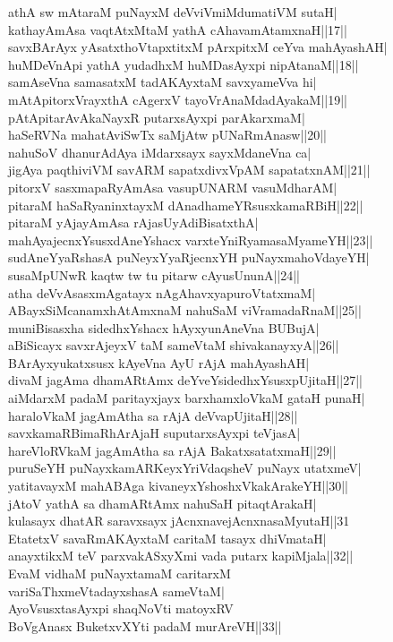 \documentclass{article}
\begin{document}
athA sw mAtaraM puNayxM deVviVmiMdumatiVM sutaH|\\
kathayAmAsa vaqtAtxMtaM yathA cAhavamAtamxnaH||17||\\
savxBArAyx yAsatxthoVtapxtitxM pArxpitxM ceYva mahAyashAH|\\
huMDeVnApi yathA yudadhxM huMDasAyxpi nipAtanaM||18||\\
samAseVna samasatxM tadAKAyxtaM savxyameVva hi|\\
mAtApitorxVrayxthA cAgerxV tayoVrAnaMdadAyakaM||19||\\
pAtApitarAvAkaNayxR putarxsAyxpi parAkarxmaM|\\
haSeRVNa mahatAviSwTx saMjAtw pUNaRmAnasw||20||\\
nahuSoV dhanurAdAya iMdarxsayx sayxMdaneVna ca|\\
jigAya paqthiviVM savARM sapatxdivxVpAM sapatatxnAM||21||\\
pitorxV sasxmapaRyAmAsa vasupUNARM vasuMdharAM|\\
pitaraM haSaRyaninxtayxM dAnadhameYRsusxkamaRBiH||22||\\
pitaraM yAjayAmAsa rAjasUyAdiBisatxthA|\\
mahAyajecnxYsusxdAneYshacx varxteYniRyamasaMyameYH||23||\\
sudAneYyaRshasA puNeyxYyaRjecnxYH puNayxmahoVdayeYH|\\
susaMpUNwR kaqtw tw tu pitarw cAyusUnunA||24||\\
atha deVvAsasxmAgatayx nAgAhavxyapuroVtatxmaM|\\
ABayxSiMcanamxhAtAmxnaM nahuSaM viVramadaRnaM||25||\\
muniBisasxha sidedhxYshacx hAyxyunAneVna BUBujA|\\
aBiSicayx savxrAjeyxV taM sameVtaM shivakanayxyA||26||\\
BArAyxyukatxsusx kAyeVna AyU rAjA mahAyashAH|\\
divaM jagAma dhamARtAmx deYveYsidedhxYsusxpUjitaH||27||\\
aiMdarxM padaM paritayxjayx barxhamxloVkaM gataH punaH|\\
haraloVkaM jagAmAtha sa rAjA deVvapUjitaH||28||\\
savxkamaRBimaRhArAjaH suputarxsAyxpi teVjasA|\\
hareVloRVkaM jagAmAtha sa rAjA BakatxsatatxmaH||29||\\
puruSeYH puNayxkamARKeyxYriVdaqsheV puNayx utatxmeV|\\
yatitavayxM mahABAga kivaneyxYshoshxVkakArakeYH||30||\\
jAtoV yathA sa dhamARtAmx nahuSaH pitaqtArakaH|\\
kulasayx dhatAR saravxsayx jAcnxnavejAcnxnasaMyutaH||31\\
EtatetxV savaRmAKAyxtaM caritaM tasayx dhiVmataH|\\
anayxtikxM teV parxvakASxyXmi vada putarx kapiMjala||32||\\
EvaM vidhaM puNayxtamaM caritarxM\\
variSaThxmeVtadayxshasA sameVtaM|\\
AyoVsusxtasAyxpi shaqNoVti matoyxRV\\
BoVgAnasx BuketxvXYti padaM murAreVH||33||
\end{document}
